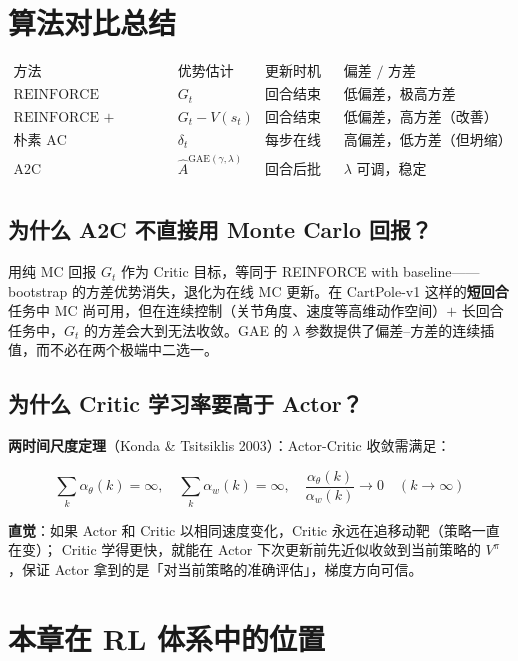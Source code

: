 \documentclass{article}
\begin{document}
\section*{算法对比总结}

\[
\begin{array}{c|c|c|c}
\text{方法} & \text{优势估计} & \text{更新时机} & \text{偏差 / 方差} \\
\hline
\text{REINFORCE} & G_t & \text{回合结束} & \text{低偏差，极高方差} \\
\text{REINFORCE + Baseline} & G_t - V(s_t) & \text{回合结束} & \text{低偏差，高方差（改善）} \\
\text{朴素 AC} & \delta_t & \text{每步在线} & \text{高偏差，低方差（但坍缩）} \\
\text{A2C} & \hat{A}^{\text{GAE}(\gamma,\lambda)} & \text{回合后批量} & \text{$\lambda$ 可调，稳定} \\
\end{array}
\]

\subsection*{为什么 A2C 不直接用 Monte Carlo 回报？}

用纯 MC 回报 $G_t$ 作为 Critic 目标，等同于 REINFORCE with baseline——bootstrap 的方差优势消失，退化为在线 MC 更新。在 CartPole-v1 这样的\textbf{短回合}任务中 MC 尚可用，但在连续控制（关节角度、速度等高维动作空间）$+$ 长回合任务中，$G_t$ 的方差会大到无法收敛。GAE 的 $\lambda$ 参数提供了偏差--方差的连续插值，而不必在两个极端中二选一。

\subsection*{为什么 Critic 学习率要高于 Actor？}

\textbf{两时间尺度定理}（Konda \& Tsitsiklis 2003）：Actor-Critic 收敛需满足：

\[
\sum_k \alpha_\theta(k) = \infty, \quad \sum_k \alpha_w(k) = \infty, \quad
\frac{\alpha_\theta(k)}{\alpha_w(k)} \to 0 \quad (k \to \infty)
\]

\textbf{直觉}：如果 Actor 和 Critic 以相同速度变化，Critic 永远在追移动靶（策略一直在变）；
Critic 学得更快，就能在 Actor 下次更新前先近似收敛到当前策略的 $V^\pi$，保证 Actor 拿到的是「对当前策略的准确评估」，梯度方向可信。

\section*{本章在 RL 体系中的位置}
\end{document}
